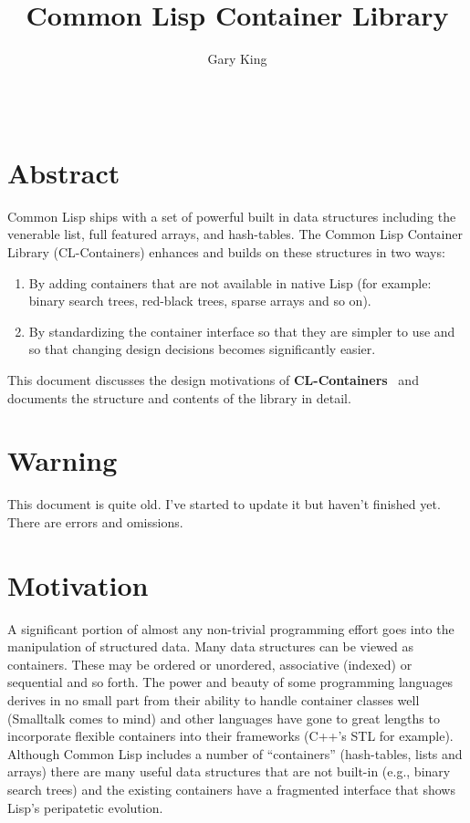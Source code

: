 \documentclass{acm_proc_article-sp}
\begin{document}
\newcommand{\clcl}
{{\bf{CL-Containers}}}

\title{Common Lisp Container Library}
\author{
\author{Gary King \\
       \\
       \\
       }
}

\date{}

\maketitle

\section{Abstract}

Common Lisp ships with a set of powerful built in data structures
including the venerable list, full featured arrays, and 
hash-tables. The Common Lisp Container Library (CL-Containers) enhances and builds
on these structures in two ways:
\begin{enumerate}
\item By adding containers that are not available in native Lisp (for
example: binary search trees, red-black trees, sparse arrays and so on).
\item By standardizing the container interface so that
they are simpler to use and so that changing design decisions becomes
significantly easier.
\end{enumerate}
This document discusses the design motivations of \clcl~ and
documents the structure and contents of the library in detail.

\section{Warning}
This document is quite old. I've started to update it but haven't finished yet. There are errors and omissions. 

\section{Motivation}
A significant portion of almost any non-trivial programming effort goes
into the manipulation of structured data. Many data structures can be
viewed as containers. These  may be
ordered or unordered, associative (indexed) or sequential and so forth.
The power and beauty of some programming languages derives in no small
part from their ability to handle container classes well (Smalltalk comes
to mind) and other languages have gone to great lengths to incorporate
flexible containers into their frameworks (C++'s STL for example).
Although Common Lisp includes a number of ``containers'' (hash-tables,
lists and arrays) there are many useful data structures that are not
built-in (e.g., binary search trees) and the existing containers have a
fragmented interface that shows Lisp's peripatetic evolution.
\end{document}
